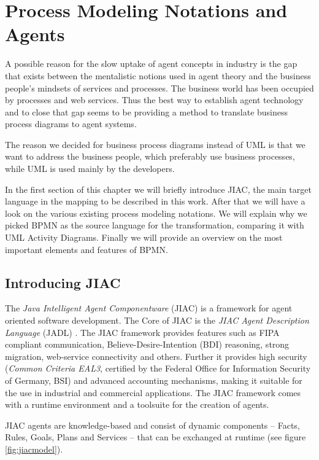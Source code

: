 \chapter{Process Modeling Notations and Agents}
\label{chapter:processes}

A possible reason for the slow uptake of agent concepts in industry is the gap that exists between the mentalistic notions used in agent theory and the business people's mindsets of services and processes.
The business world has been occupied by processes and web services. Thus the best way to establish agent technology and to close that gap seems to be providing a method to translate business process diagrams to agent systems.

The reason we decided for business process diagrams instead of UML is that we want to address the business people, which preferably use business processes, while UML is used mainly by the developers.

In the first section of this chapter we will briefly introduce JIAC, the main target language in the mapping to be described in this work. After that we will have a look on the various existing process modeling notations. We will explain why we picked BPMN as the source language for the transformation, comparing it with UML Activity Diagrams. Finally we will provide an overview on the most important elements and features of BPMN.



\section{Introducing JIAC}

The \emph{Java Intelligent Agent Componentware} (JIAC) is a framework for agent oriented software development. The Core of JIAC is the \emph{JIAC Agent Description Language} (JADL) \cite{konnerth05jadl}. The JIAC framework provides features such as FIPA compliant communication, Believe-Desire-Intention (BDI) reasoning, strong migration, web-service connectivity and others. Further it provides high security (\emph{Common Criteria EAL3}, certified by the Federal Office for Information Security of Germany, BSI) and advanced accounting mechanisms, making it suitable for the use in industrial and commercial applications. The JIAC framework comes with a runtime environment and a toolsuite for the creation of agents.

JIAC agents are knowledge-based and consist of dynamic components -- Facts, Rules, Goals, Plans and Services -- that can be exchanged at runtime (see figure \ref{fig:jiacmodel}).

